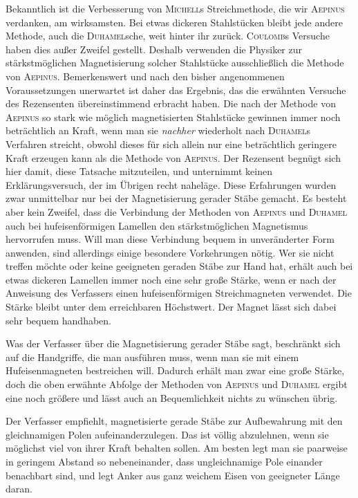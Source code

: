 Bekanntlich ist die Verbesserung von \textsc{Michell}s Streichmethode, die wir \textsc{Aepinus} verdanken, am wirksamsten. Bei etwas dickeren Stahlstücken bleibt jede andere Methode, auch die \textsc{Duhamel}sche, weit hinter ihr zurück. \textsc{Coulomb}s Versuche haben dies außer Zweifel gestellt. Deshalb verwenden die Physiker zur stärkstmöglichen Magnetisierung solcher Stahlstücke ausschließlich die Methode von \textsc{Aepinus}. Bemerkenswert und nach den bisher angenommenen Voraussetzungen unerwartet ist daher das Ergebnis, das die erwähnten Versuche des Rezensenten übereinstimmend erbracht haben. Die nach der Methode von \textsc{Aepinus} so stark wie möglich magnetisierten Stahlstücke gewinnen immer noch beträchtlich an Kraft, wenn man sie \textit{nachher} wiederholt nach \textsc{Duhamel}s Verfahren streicht, obwohl dieses für sich allein nur eine beträchtlich geringere Kraft erzeugen kann als die Methode von \textsc{Aepinus}. Der Rezensent begnügt sich hier damit, diese Tatsache mitzuteilen, und unternimmt keinen Erklärungsversuch, der im Übrigen recht naheläge. Diese Erfahrungen wurden zwar unmittelbar nur bei der Magnetisierung gerader Stäbe gemacht. Es besteht aber kein Zweifel, dass die Verbindung der Methoden von \textsc{Aepinus} und \textsc{Duhamel} auch bei hufeisenförmigen Lamellen den stärkstmöglichen Magnetismus hervorrufen muss. Will man diese Verbindung bequem in unveränderter Form anwenden, sind allerdings einige besondere Vorkehrungen nötig. Wer sie nicht treffen möchte oder keine geeigneten geraden Stäbe zur Hand hat, erhält auch bei etwas dickeren Lamellen immer noch eine sehr große Stärke, wenn er nach der Anweisung des Verfassers einen hufeisenförmigen Streichmagneten verwendet. Die Stärke bleibt unter dem erreichbaren Höchstwert. Der Magnet lässt sich dabei sehr bequem handhaben.

Was der Verfasser über die Magnetisierung gerader Stäbe sagt, beschränkt sich auf die Handgriffe, die man ausführen muss, wenn man sie mit einem Hufeisenmagneten bestreichen will. Dadurch erhält man zwar eine große Stärke, doch die oben erwähnte Abfolge der Methoden von \textsc{Aepinus} und \textsc{Duhamel} ergibt eine noch größere und lässt auch an Bequemlichkeit nichts zu wünschen übrig.

Der Verfasser empfiehlt, magnetisierte gerade Stäbe zur Aufbewahrung mit den gleichnamigen Polen aufeinanderzulegen. Das ist völlig abzulehnen, wenn sie möglichst viel von ihrer Kraft behalten sollen. Am besten legt man sie paarweise in geringem Abstand so nebeneinander, dass ungleichnamige Pole einander benachbart sind, und legt Anker aus ganz weichem Eisen von geeigneter Länge daran.

